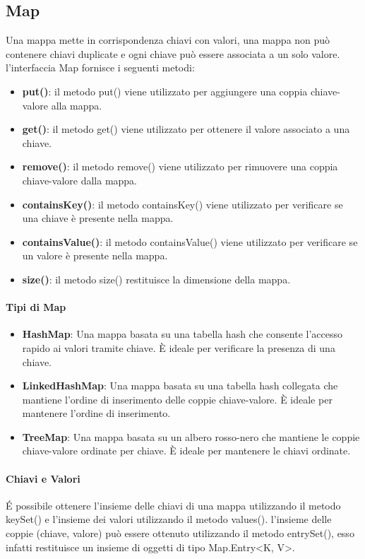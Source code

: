 \documentclass[11pt]{article}
\begin{document}
\subsection{Map}
Una mappa mette in corrispondenza chiavi con valori, una mappa non può contenere chiavi duplicate e ogni chiave può essere associata a un solo valore.
l'interfaccia Map fornisce i seguenti metodi:
\begin{itemize}
    \item \textbf{put()}: il metodo put() viene utilizzato per aggiungere una coppia chiave-valore alla mappa.
    \item \textbf{get()}: il metodo get() viene utilizzato per ottenere il valore associato a una chiave.
    \item \textbf{remove()}: il metodo remove() viene utilizzato per rimuovere una coppia chiave-valore dalla mappa.
    \item \textbf{containsKey()}: il metodo containsKey() viene utilizzato per verificare se una chiave è presente nella mappa.
    \item \textbf{containsValue()}: il metodo containsValue() viene utilizzato per verificare se un valore è presente nella mappa.
    \item \textbf{size()}: il metodo size() restituisce la dimensione della mappa.
    \end{itemize}
\paragraph{Tipi di Map}
\begin{itemize}
    \item \textbf{HashMap}: Una mappa basata su una tabella hash che consente l'accesso rapido ai valori tramite chiave. È ideale per verificare la presenza di una chiave.
    \item \textbf{LinkedHashMap}: Una mappa basata su una tabella hash collegata che mantiene l'ordine di inserimento delle coppie chiave-valore. È ideale per mantenere l'ordine di inserimento.
    \item \textbf{TreeMap}: Una mappa basata su un albero rosso-nero che mantiene le coppie chiave-valore ordinate per chiave. È ideale per mantenere le chiavi ordinate.
    \end{itemize}
\paragraph{Chiavi e Valori}
É possibile ottenere l'insieme delle chiavi di una mappa utilizzando il metodo keySet() e l'insieme dei valori utilizzando il metodo values().
l'insieme delle coppie (chiave, valore) può essere ottenuto utilizzando il metodo entrySet(), esso infatti restituisce un insieme di oggetti di tipo Map.Entry<K, V>.
\end{document}
